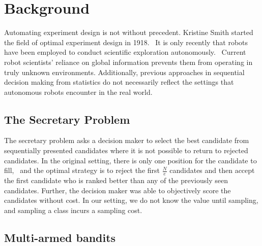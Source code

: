 \section{Background}
\label{sec:background}

Automating experiment design is not without precedent.  Kristine Smith started the field of optimal experiment design in 1918.~\cite{smith1918standard}
It is only recently that robots have been employed to conduct scientific exploration autonomously.~\cite{wagner2001science,king2004functional}  Current robot scientists' reliance on global information prevents them from operating in truly unknown environments.  Additionally, previous approaches in sequential decision making from statistics do not necessarily reflect the settings that autonomous robots encounter in the real world.


\subsection{The Secretary Problem}

The secretary problem asks a decision maker to select the best candidate from
sequentially presented candidates where it is not possible to return to
rejected candidates.  In the original setting, there is only one
position for the candidate to fill,~\cite{ferguson1989solved} and the
optimal strategy is to reject the first $\frac{N}{e}$ candidates and then accept
the first candidate who is ranked better than any of the previously seen
candidates.  Further, the decision maker
was able to objectively score the candidates without cost.  In our setting, we do not know the value until sampling, and sampling a class incurs a sampling cost.


\subsection{Multi-armed bandits}

